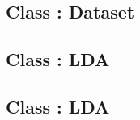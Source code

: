 \documentclass[12pt,landscape,twopage]{article}
\begin{document}
\subsection{Class : Dataset} \label{class:dataset}


\subsection{Class : LDA} \label{class:lda}


\subsection{Class : LDA} \label{code:generativeModel}

\end{document}
